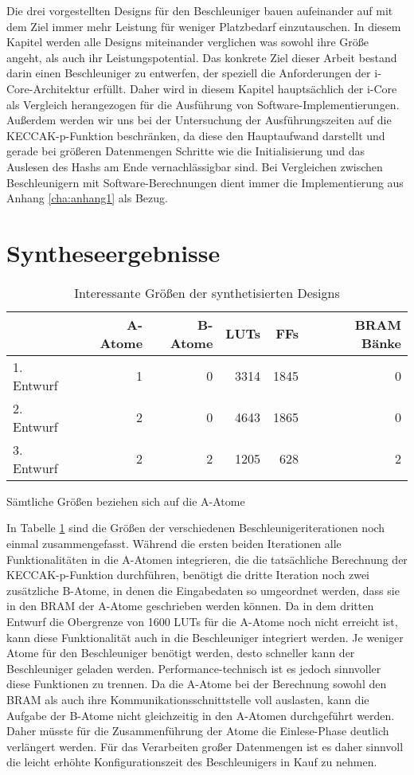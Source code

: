 Die drei vorgestellten Designs für den Beschleuniger bauen aufeinander auf mit dem Ziel immer mehr Leistung für weniger Platzbedarf einzutauschen.
In diesem Kapitel werden alle Designs miteinander verglichen was sowohl ihre Größe angeht, als auch ihr Leistungspotential.
Das konkrete Ziel dieser Arbeit bestand darin einen Beschleuniger zu entwerfen, der speziell die Anforderungen der i-Core-Architektur erfüllt.
Daher wird in diesem Kapitel hauptsächlich der i-Core als Vergleich herangezogen für die Ausführung von Software-Implementierungen.
Außerdem werden wir uns bei der Untersuchung der Ausführungszeiten auf die KECCAK-p-Funktion beschränken,
da diese den Hauptaufwand darstellt und gerade bei größeren Datenmengen Schritte wie die Initialisierung und das Auslesen des Hashs am Ende vernachlässigbar sind.
Bei Vergleichen zwischen Beschleunigern mit Software-Berechnungen dient immer die Implementierung aus Anhang \ref{cha:anhang1} als Bezug.

\section{Syntheseergebnisse}
\begin{table}
    \centering
    \begin{tabular}{lrrrrr}
    & A-Atome & B-Atome & LUTs & FFs & BRAM Bänke \\
    \hline
    1. Entwurf & 1 & 0 & 3314 & 1845 & 0 \\
    2. Entwurf & 2 & 0 & 4643 & 1865 & 0 \\
    3. Entwurf & 2 & 2 & 1205 & 628 & 2
    \end{tabular}
    \label{tab:synth_ergebniss}
    \caption{Interessante Größen der synthetisierten Designs}
    \small
    Sämtliche Größen beziehen sich auf die A-Atome
\end{table}
In Tabelle \ref{tab:synth_ergebniss} sind die Größen der verschiedenen Beschleunigeriterationen noch einmal zusammengefasst.
Während die ersten beiden Iterationen alle Funktionalitäten in die A-Atomen integrieren, die die tatsächliche Berechnung der KECCAK-p-Funktion durchführen,
benötigt die dritte Iteration noch zwei zusätzliche B-Atome, in denen die Eingabedaten so umgeordnet werden, dass sie in den BRAM der A-Atome geschrieben werden können.
Da in dem dritten Entwurf die Obergrenze von 1600 LUTs für die A-Atome noch nicht erreicht ist, kann diese Funktionalität auch in die Beschleuniger integriert werden.
Je weniger Atome für den Beschleuniger benötigt werden, desto schneller kann der Beschleuniger geladen werden.
Performance-technisch ist es jedoch sinnvoller diese Funktionen zu trennen. Da die A-Atome bei der Berechnung sowohl den BRAM als auch ihre Kommunikationsschnittstelle
voll auslasten, kann die Aufgabe der B-Atome nicht gleichzeitig in den A-Atomen durchgeführt werden. Daher müsste für die Zusammenführung der Atome die Einlese-Phase deutlich verlängert werden.
Für das Verarbeiten großer Datenmengen ist es daher sinnvoll die leicht erhöhte Konfigurationszeit des Beschleunigers in Kauf zu nehmen.

